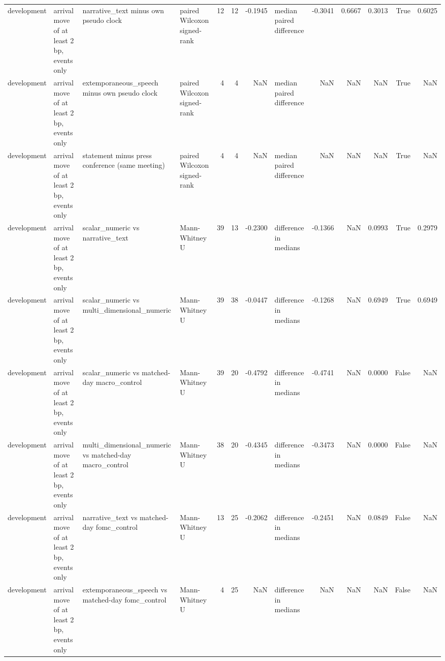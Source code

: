 \begin{tabular}{llllrrrlrrrrr}
development & arrival move of at least 2 bp, events only & narrative_text minus own pseudo clock & paired Wilcoxon signed-rank & 12 & 12 & -0.1945 & median paired difference & -0.3041 & 0.6667 & 0.3013 & True & 0.6025 \\
development & arrival move of at least 2 bp, events only & extemporaneous_speech minus own pseudo clock & paired Wilcoxon signed-rank & 4 & 4 & NaN & median paired difference & NaN & NaN & NaN & True & NaN \\
development & arrival move of at least 2 bp, events only & statement minus press conference (same meeting) & paired Wilcoxon signed-rank & 4 & 4 & NaN & median paired difference & NaN & NaN & NaN & True & NaN \\
development & arrival move of at least 2 bp, events only & scalar_numeric vs narrative_text & Mann-Whitney U & 39 & 13 & -0.2300 & difference in medians & -0.1366 & NaN & 0.0993 & True & 0.2979 \\
development & arrival move of at least 2 bp, events only & scalar_numeric vs multi_dimensional_numeric & Mann-Whitney U & 39 & 38 & -0.0447 & difference in medians & -0.1268 & NaN & 0.6949 & True & 0.6949 \\
development & arrival move of at least 2 bp, events only & scalar_numeric vs matched-day macro_control & Mann-Whitney U & 39 & 20 & -0.4792 & difference in medians & -0.4741 & NaN & 0.0000 & False & NaN \\
development & arrival move of at least 2 bp, events only & multi_dimensional_numeric vs matched-day macro_control & Mann-Whitney U & 38 & 20 & -0.4345 & difference in medians & -0.3473 & NaN & 0.0000 & False & NaN \\
development & arrival move of at least 2 bp, events only & narrative_text vs matched-day fomc_control & Mann-Whitney U & 13 & 25 & -0.2062 & difference in medians & -0.2451 & NaN & 0.0849 & False & NaN \\
development & arrival move of at least 2 bp, events only & extemporaneous_speech vs matched-day fomc_control & Mann-Whitney U & 4 & 25 & NaN & difference in medians & NaN & NaN & NaN & False & NaN \\
\bottomrule
\end{tabular}

